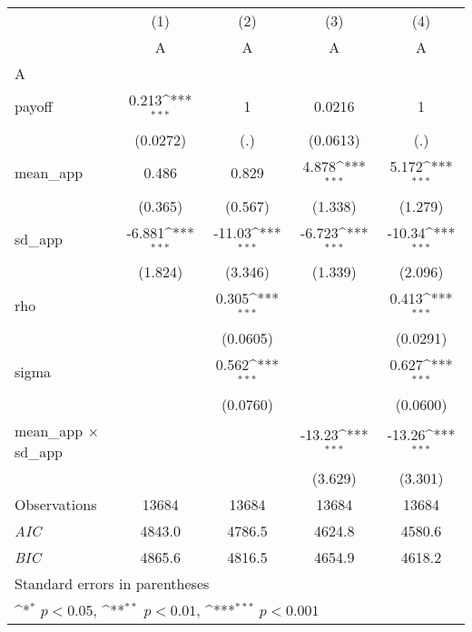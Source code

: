 {
\def\sym#1{\ifmmode^{#1}\else\(^{#1}\)\fi}
\begin{tabular}{l*{4}{c}}
\hline\hline
                    &\multicolumn{1}{c}{(1)}&\multicolumn{1}{c}{(2)}&\multicolumn{1}{c}{(3)}&\multicolumn{1}{c}{(4)}\\
                    &\multicolumn{1}{c}{A}&\multicolumn{1}{c}{A}&\multicolumn{1}{c}{A}&\multicolumn{1}{c}{A}\\
\hline
A                   &                     &                     &                     &                     \\
payoff              &       0.213\sym{***}&           1         &      0.0216         &           1         \\
                    &    (0.0272)         &         (.)         &    (0.0613)         &         (.)         \\
[1em]
mean\_app            &       0.486         &       0.829         &       4.878\sym{***}&       5.172\sym{***}\\
                    &     (0.365)         &     (0.567)         &     (1.338)         &     (1.279)         \\
[1em]
sd\_app              &      -6.881\sym{***}&      -11.03\sym{***}&      -6.723\sym{***}&      -10.34\sym{***}\\
                    &     (1.824)         &     (3.346)         &     (1.339)         &     (2.096)         \\
[1em]
rho                 &                     &       0.305\sym{***}&                     &       0.413\sym{***}\\
                    &                     &    (0.0605)         &                     &    (0.0291)         \\
[1em]
sigma               &                     &       0.562\sym{***}&                     &       0.627\sym{***}\\
                    &                     &    (0.0760)         &                     &    (0.0600)         \\
[1em]
mean\_app $\times$ sd\_app&                     &                     &      -13.23\sym{***}&      -13.26\sym{***}\\
                    &                     &                     &     (3.629)         &     (3.301)         \\
\hline
Observations        &       13684         &       13684         &       13684         &       13684         \\
\textit{AIC}        &      4843.0         &      4786.5         &      4624.8         &      4580.6         \\
\textit{BIC}        &      4865.6         &      4816.5         &      4654.9         &      4618.2         \\
\hline\hline
\multicolumn{5}{l}{\footnotesize Standard errors in parentheses}\\
\multicolumn{5}{l}{\footnotesize \sym{*} \(p<0.05\), \sym{**} \(p<0.01\), \sym{***} \(p<0.001\)}\\
\end{tabular}
}
